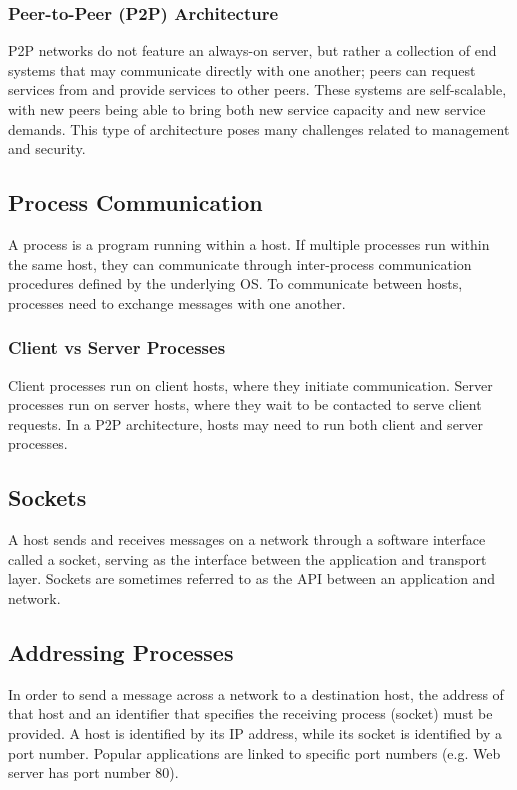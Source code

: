 \documentclass[12pt,titlepage]{article}
\begin{document}
      \subsubsection{Peer-to-Peer (P2P) Architecture}
        P2P networks do not feature an always-on server, but rather a collection of end systems that may communicate directly with one another; peers can request services
        from and provide services to other peers. These systems are self-scalable, with new peers being able to bring both new service capacity and new service demands. This
        type of architecture poses many challenges related to management and security.

    \subsection{Process Communication}
      A process is a program running within a host. If multiple processes run within the same host, they can communicate through inter-process communication procedures defined
      by the underlying OS. To communicate between hosts, processes need to exchange messages with one another.
      \subsubsection{Client vs Server Processes}
        Client processes run on client hosts, where they initiate communication. Server processes run on server hosts, where they wait to be contacted to serve client requests.
        In a P2P architecture, hosts may need to run both client and server processes.

    \subsection{Sockets}
      A host sends and receives messages on a network through a software interface called a socket, serving as the interface between the application and transport layer. Sockets
      are sometimes referred to as the API between an application and network.

    \subsection{Addressing Processes}
      In order to send a message across a network to a destination host, the address of that host and an identifier that specifies the receiving process (socket) must be provided.
      A host is identified by its IP address, while its socket is identified by a port number. Popular applications are linked to specific port numbers (e.g. Web server has port
      number 80).
\end{document}
